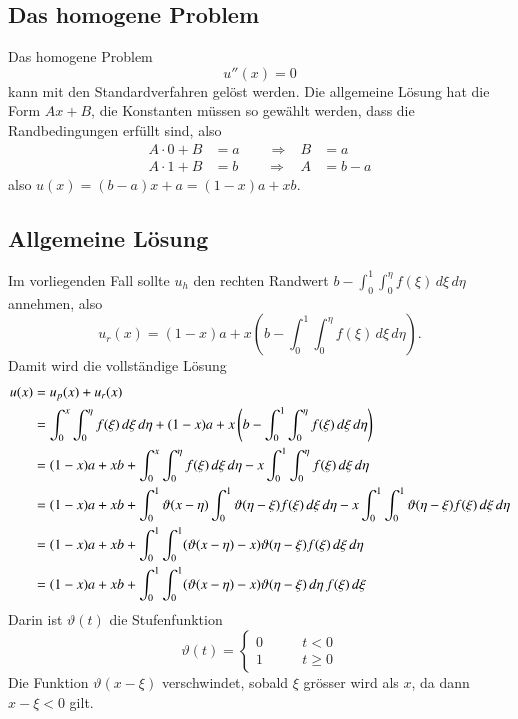 \subsection{Das homogene Problem}
Das homogene Problem
\[
u''(x)=0
\]
kann mit den Standardverfahren gelöst werden. Die allgemeine
Lösung hat die Form $Ax+B$, die Konstanten müssen so gewählt werden,
dass die Randbedingungen erfüllt sind, also
\begin{align*}
A\cdot 0+B&=a\qquad\Rightarrow&B&=a\\
A\cdot 1+B&=b\qquad\Rightarrow&A&=b-a
\end{align*}
also $u(x)=(b-a)x+a=(1-x)a+xb$.

\subsection{Allgemeine Lösung}
Im vorliegenden Fall sollte $u_h$ den rechten Randwert $b-\int_0^1\int_0^\eta f(\xi)\,d\xi\,d\eta$
annehmen, also
\[
u_r(x)=(1-x)a+x\left(b-\int_0^1\int_0^\eta f(\xi)\,d\xi\,d\eta\right).
\]
Damit wird die vollständige Lösung
\begin{align}
u(x)&=u_p(x)+u_r(x)\notag
\\
&=\int_0^x\int_0^\eta f(\xi)\,d\xi\,d\eta+(1-x)a+x\left(b-\int_0^1\int_0^\eta f(\xi)\,d\xi\,d\eta\right)\notag
\\
&=
(1-x)a+xb
+\int_0^x\int_0^\eta f(\xi)\,d\xi\,d\eta
-x\int_0^1\int_0^\eta f(\xi)\,d\xi\,d\eta\notag
\\
&=
(1-x)a+xb
+\int_0^1\vartheta(x-\eta)\int_0^1 \vartheta(\eta - \xi)f(\xi)\,d\xi\,d\eta
-x\int_0^1\int_0^1\vartheta(\eta-\xi) f(\xi)\,d\xi\,d\eta\notag
\\
&=
(1-x)a+xb
+\int_0^1\int_0^1
(\vartheta(x-\eta)-x)\vartheta(\eta -\xi)
f(\xi)\,d\xi\,d\eta
\notag
\\
&=
(1-x)a+xb+\int_0^1\int_0^1
(\vartheta(x-\eta)-x)\vartheta(\eta -\xi)
\,d\eta\,
f(\xi)\,d\xi
\label{1dimgreen}
\end{align}
Darin ist $\vartheta(t)$ die Stufenfunktion
\[
\vartheta(t)=\begin{cases}
0&\qquad t<0\\
1&\qquad t\ge 0
\end{cases}
\]
Die Funktion $\vartheta(x-\xi)$ verschwindet, sobald $\xi$ grösser wird
als $x$, da dann $x-\xi<0$ gilt.

